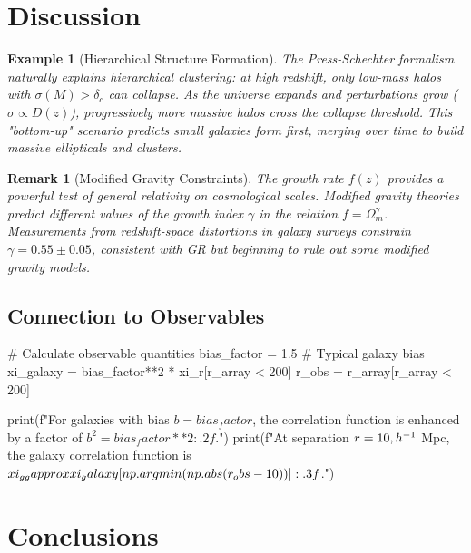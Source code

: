 \documentclass[a4paper, 11pt]{article}
\newtheorem{example}{Example}[section]
\newtheorem{remark}{Remark}[section]
\begin{document}
\section{Discussion}

\begin{example}[Hierarchical Structure Formation]
The Press-Schechter formalism naturally explains hierarchical clustering: at high redshift,
only low-mass halos with $\sigma(M) > \delta_c$ can collapse. As the universe expands and
perturbations grow ($\sigma \propto D(z)$), progressively more massive halos cross the
collapse threshold. This "bottom-up" scenario predicts small galaxies form first, merging
over time to build massive ellipticals and clusters.
\end{example}

\begin{remark}[Modified Gravity Constraints]
The growth rate $f(z)$ provides a powerful test of general relativity on cosmological scales.
Modified gravity theories predict different values of the growth index $\gamma$ in the
relation $f = \Omega_m^{\gamma}$. Measurements from redshift-space distortions in galaxy
surveys constrain $\gamma = 0.55 \pm 0.05$, consistent with GR but beginning to rule out
some modified gravity models.
\end{remark}

\subsection{Connection to Observables}

\begin{pycode}
# Calculate observable quantities
bias_factor = 1.5  # Typical galaxy bias
xi_galaxy = bias_factor**2 * xi_r[r_array < 200]
r_obs = r_array[r_array < 200]

print(f"For galaxies with bias $b = {bias_factor}$, the correlation function is enhanced by a factor of $b^2 = {bias_factor**2:.2f}$.")
print(f"At separation $r = 10\\,h^{{-1}}$ Mpc, the galaxy correlation function is $\\xi_{{gg}} \\approx {xi_galaxy[np.argmin(np.abs(r_obs - 10))]:.3f}$.")
\end{pycode}

\section{Conclusions}
\end{document}
